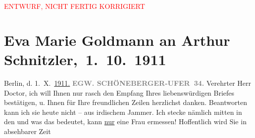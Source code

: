 
\begin{center}
            \textcolor{red}{ENTWURF, NICHT FERTIG KORRIGIERT}
                      \end{center}
            
         
         \renewcommand{\erwaehntePersonen}{Personen: Paul Goldmann, Olga Schnitzler}
         \renewcommand{\erwaehnteInstitutionen}{Institutionen: Lessing-Theater}
         \renewcommand{\erwaehnteOrte}{Orte: Bendlerstraße, Berlin, Schöneberger Ufer, Wien}
         \renewcommand{\erwaehnteWerke}{Werke: Das weite Land. Tragikomödie in fünf Akten, Tagebuch}
               \section[ Eva Marie Goldmann an Arthur Schnitzler, 1. 10. 1911]{ Eva Marie Goldmann an Arthur Schnitzler, 1. 10. 1911}\nopagebreak{}\rehead{ }\begin{ledgroupsized}[t]{13cm}\normalsize\beginnumbering \toendnotes[C]{\smallbreak\pagebreak[2]} 
\toendnotes[C]{\smallbreak}\pstart
           \raggedleft{}{\pb}Berlin, d. 1. X. \uline{1911}\uline{.}\pend
           \pstart
           \textcolor{gray}{\textbf{EG}}\hfill \textcolor{gray}{\textbf{W.
                              SCHÖNEBERGER-UFER 34.}}\pend
           \pstart{}Verehrter Herr Doctor,\pend\pstart
           ich will Ihnen nur rasch den Empfang Ihres liebenswürdigen Briefes bestätigen, u.
               Ihnen für Ihre freundlichen Zeilen herzlichst danken. Beantworten kann ich sie heute nicht – aus irdischem Jammer. {\pb}Ich stecke nämlich mitten in den \label{K_L03541-1v}\label{K_L03541-1h} und was das bedeutet, kann \uline{nur} eine Frau ermessen!\pend
           \pstart
           Hoffentlich wird Sie in absehbarer Zeit \label{K_L03541-2v}
\end{ledgroupsized}
